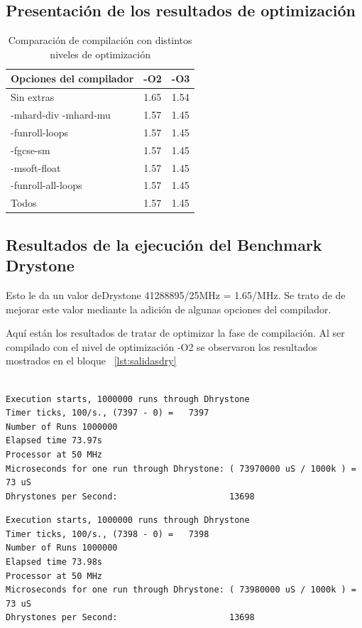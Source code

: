 	\subsection {Presentación de los resultados de optimización} 
\begin{table}[h!]
\begin{center}
\begin{tabular}{ |l |l| l|}
\hline
\rowcolor[gray]{0.8} Opciones del compilador&-O2&-O3 \\
\hline
Sin extras 					&1.65 			&1.54\\
\hline
-mhard-div -mhard-mu 	& 1.57			&1.45 \\
\hline
-funroll-loops			 	& 1.57			& 1.45 \\
\hline
-fgcse-sm					& 1.57			& 1.45 \\
\hline
-msoft-float 				& 1.57			&1.45  \\
\hline
-funroll-all-loops	 		& 1.57			& 1.45 \\
\hline
Todos	 					& 1.57			& 1.45 \\
\hline
\end{tabular}
\end{center}
\caption{Comparación de compilación con distintos niveles de optimización}
\end{table}
\newpage
		\subsection{Resultados de la ejecución del Benchmark Drystone}

Esto le da un valor deDrystone 41288895/25MHz = 1.65/MHz. Se trato de de mejorar este valor mediante la adición de algunas opciones del compilador.

Aquí están los resultados de tratar de optimizar la fase de compilación. Al ser compilado con el nivel de optimización -O2 se observaron los resultados mostrados en el bloque ~\ref{lst:salidasdry} 

\begin{lstlisting}[frame=single,caption={Sin optimizaciones },label={lst:salidas},breaklines]

Execution starts, 1000000 runs through Dhrystone
Timer ticks, 100/s., (7397 - 0) =	7397
Number of Runs 1000000
Elapsed time 73.97s
Processor at 50 MHz
Microseconds for one run through Dhrystone: ( 73970000 uS / 1000k ) = 73 uS
Dhrystones per Second:                      13698 
\end{lstlisting}

\begin{lstlisting}[frame=single,caption={Optimización nivel -O2},label={lst:salidas},breaklines]
Execution starts, 1000000 runs through Dhrystone
Timer ticks, 100/s., (7398 - 0) =	7398
Number of Runs 1000000
Elapsed time 73.98s
Processor at 50 MHz
Microseconds for one run through Dhrystone: ( 73980000 uS / 1000k ) = 73 uS
Dhrystones per Second:                      13698 
\end{lstlisting}

